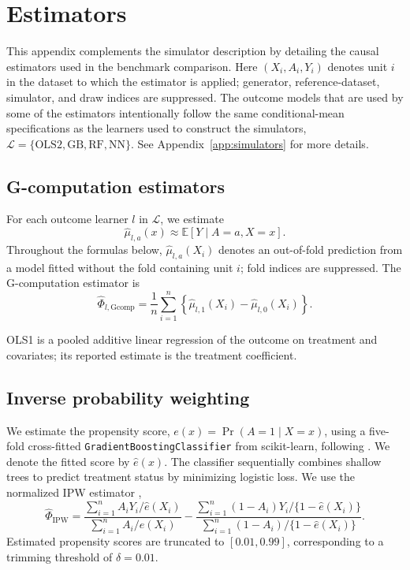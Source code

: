 \clearpage
\section{Estimators}
\label{app:estimators}

This appendix complements the simulator description by detailing the causal estimators used in the benchmark comparison. Here \((X_i,A_i,Y_i)\) denotes unit \(i\) in the dataset to which the estimator is applied; generator, reference-dataset, simulator, and draw indices are suppressed. The outcome models that are used by some of the estimators intentionally follow the same conditional-mean specifications as the learners used to construct the simulators, \(\mathcal L=\{\mathrm{OLS2},\mathrm{GB},\mathrm{RF},\mathrm{NN}\}\). See Appendix~\ref{app:simulators} for more details.

\subsection{G-computation estimators}

For each outcome learner \(l\) in \(\mathcal L\), we estimate
\[
\widehat{\mu}_{l,a}(x)
\approx
\mathbb E[Y\mid A=a,X=x].
\]
Throughout the formulas below, \(\widehat\mu_{l,a}(X_i)\) denotes an out-of-fold prediction from a model fitted without the fold containing unit \(i\); fold indices are suppressed.
The G-computation estimator is
\[
\widehat{\Phi}_{l,\mathrm{Gcomp}}
=
\frac{1}{n}
\sum_{i=1}^{n}
\left\{
\widehat{\mu}_{l,1}(X_i)
-
\widehat{\mu}_{l,0}(X_i)
\right\}.
\]

OLS1 is a pooled additive linear regression of the outcome on treatment and covariates; its reported estimate is the treatment coefficient.

\subsection{Inverse probability weighting}
\label{app:ipw}

We estimate the propensity score, \mbox{\(e(x)=\Pr(A=1\mid X=x)\)}, using a five-fold cross-fitted \texttt{GradientBoostingClassifier} from scikit-learn, following . We denote the fitted score by \(\widehat e(x)\). The classifier sequentially combines shallow trees to predict treatment status by minimizing logistic loss. We use the normalized IPW estimator \cite{luncefordStratificationWeightingPropensity2004},
\[
\widehat{\Phi}_{\mathrm{IPW}}
=
\frac{
\sum_{i=1}^{n}
A_iY_i/\widehat e(X_i)
}{
\sum_{i=1}^{n}
A_i/\widehat e(X_i)
}
-
\frac{
\sum_{i=1}^{n}
(1-A_i)Y_i/\{1-\widehat e(X_i)\}
}{
\sum_{i=1}^{n}
(1-A_i)/\{1-\widehat e(X_i)\}
}.
\]
Estimated propensity scores are truncated to \([0.01,0.99]\), corresponding to a trimming threshold of \(\delta=0.01\).

